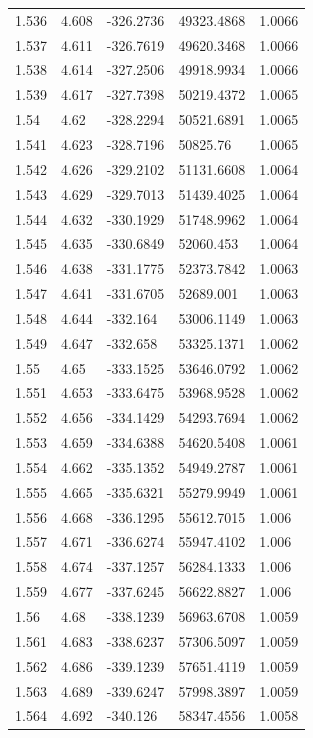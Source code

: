 \begin{tabular}{lllll}
1.536 & 4.608 & -326.2736 & 49323.4868 & 1.0066 \\
1.537 & 4.611 & -326.7619 & 49620.3468 & 1.0066 \\
1.538 & 4.614 & -327.2506 & 49918.9934 & 1.0066 \\
1.539 & 4.617 & -327.7398 & 50219.4372 & 1.0065 \\
1.54 & 4.62 & -328.2294 & 50521.6891 & 1.0065 \\
1.541 & 4.623 & -328.7196 & 50825.76 & 1.0065 \\
1.542 & 4.626 & -329.2102 & 51131.6608 & 1.0064 \\
1.543 & 4.629 & -329.7013 & 51439.4025 & 1.0064 \\
1.544 & 4.632 & -330.1929 & 51748.9962 & 1.0064 \\
1.545 & 4.635 & -330.6849 & 52060.453 & 1.0064 \\
1.546 & 4.638 & -331.1775 & 52373.7842 & 1.0063 \\
1.547 & 4.641 & -331.6705 & 52689.001 & 1.0063 \\
1.548 & 4.644 & -332.164 & 53006.1149 & 1.0063 \\
1.549 & 4.647 & -332.658 & 53325.1371 & 1.0062 \\
1.55 & 4.65 & -333.1525 & 53646.0792 & 1.0062 \\
1.551 & 4.653 & -333.6475 & 53968.9528 & 1.0062 \\
1.552 & 4.656 & -334.1429 & 54293.7694 & 1.0062 \\
1.553 & 4.659 & -334.6388 & 54620.5408 & 1.0061 \\
1.554 & 4.662 & -335.1352 & 54949.2787 & 1.0061 \\
1.555 & 4.665 & -335.6321 & 55279.9949 & 1.0061 \\
1.556 & 4.668 & -336.1295 & 55612.7015 & 1.006 \\
1.557 & 4.671 & -336.6274 & 55947.4102 & 1.006 \\
1.558 & 4.674 & -337.1257 & 56284.1333 & 1.006 \\
1.559 & 4.677 & -337.6245 & 56622.8827 & 1.006 \\
1.56 & 4.68 & -338.1239 & 56963.6708 & 1.0059 \\
1.561 & 4.683 & -338.6237 & 57306.5097 & 1.0059 \\
1.562 & 4.686 & -339.1239 & 57651.4119 & 1.0059 \\
1.563 & 4.689 & -339.6247 & 57998.3897 & 1.0059 \\
1.564 & 4.692 & -340.126 & 58347.4556 & 1.0058 \\

\end{tabular}
